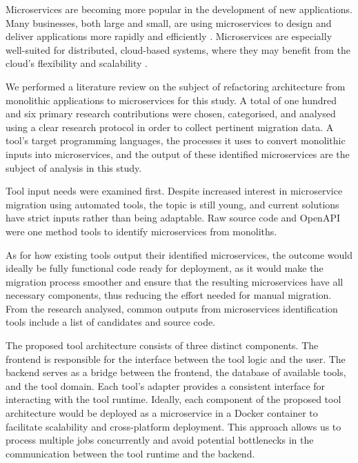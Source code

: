 \documentclass[conference]{IEEEtran}
\begin{document}
Microservices are becoming more popular in the development of new applications.
Many businesses, both large and small, are using microservices to design and
deliver applications more rapidly and efficiently
\cite{richardson-microservices}. Microservices are especially well-suited for
distributed, cloud-based systems, where they may benefit from the cloud's
flexibility and scalability \cite{fowler-microservices-prerequisites}.

We performed a literature review on the subject of refactoring architecture
from monolithic applications to microservices for this study. A total of one
hundred and six primary research contributions were chosen, categorised, and
analysed using a clear research protocol in order to collect pertinent
migration data. A tool's target programming languages, the processes it uses to
convert monolithic inputs into microservices, and the output of these
identified microservices are the subject of analysis in this study.

Tool input needs were examined first. Despite increased interest in
microservice migration using automated tools, the topic is still young, and
current solutions have strict inputs rather than being adaptable. Raw source
code and OpenAPI were one method tools to identify microservices from
monoliths.

As for how existing tools output their identified microservices, the outcome
would ideally be fully functional code ready for deployment, as it would make
the migration process smoother and ensure that the resulting microservices have
all necessary components, thus reducing the effort needed for manual migration.
From the research analysed, common outputs from microservices identification
tools include a list of candidates and source code.

The proposed tool architecture consists of three distinct components. The
frontend is responsible for the interface between the tool logic and the user.
The backend serves as a bridge between the frontend, the database of available
tools, and the tool domain. Each tool's adapter provides a consistent interface
for interacting with the tool runtime. Ideally, each component of the proposed
tool architecture would be deployed as a microservice in a Docker container to
facilitate scalability and cross-platform deployment. This approach allows us
to process multiple jobs concurrently and avoid potential bottlenecks in the
communication between the tool runtime and the backend.



\balance
{}
\end{document}
